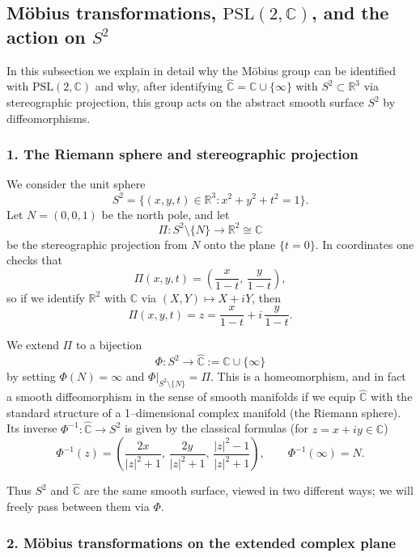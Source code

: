 \documentclass[12pt,a4paper]{article}
\theoremstyle{plain}
\theoremstyle{definition}      %
\begin{document}
	\subsection*{Möbius transformations, \texorpdfstring{$\mathrm{PSL}(2,\mathbb{C})$}{PSL(2,C)}, and the action on $S^{2}$}
	
	In this subsection we explain in detail why the Möbius group can be identified
	with $\mathrm{PSL}(2,\mathbb{C})$ and why, after identifying
	$\widehat{\mathbb{C}} = \mathbb{C}\cup\{\infty\}$ with $S^{2}\subset\mathbb{R}^3$
	via stereographic projection, this group acts on the abstract smooth surface
	$S^2$ by diffeomorphisms.
	
	\subsubsection*{1. The Riemann sphere and stereographic projection}
	
	We consider the unit sphere
	\[
	S^{2} = \{(x,y,t)\in\mathbb{R}^{3} : x^{2}+y^{2}+t^{2}=1\}.
	\]
	Let $N=(0,0,1)$ be the north pole, and let
	\[
	\Pi : S^{2}\setminus\{N\} \longrightarrow \mathbb{R}^{2}\cong\mathbb{C}
	\]
	be the stereographic projection from $N$ onto the plane $\{t=0\}$.  In
	coordinates one checks that
	\[
	\Pi(x,y,t) = \left( \frac{x}{1-t},\,\frac{y}{1-t} \right),
	\]
	so if we identify $\mathbb{R}^{2}$ with $\mathbb{C}$ via
	$(X,Y)\mapsto X+iY$, then
	\[
	\Pi(x,y,t) = z = \frac{x}{1-t} + i\,\frac{y}{1-t}.
	\]
	
	We extend $\Pi$ to a bijection
	\[
	\Phi : S^{2} \longrightarrow \widehat{\mathbb{C}} := \mathbb{C}\cup\{\infty\}
	\]
	by setting $\Phi(N) = \infty$ and $\Phi|_{S^{2}\setminus\{N\}} = \Pi$.
	This is a homeomorphism, and in fact a smooth diffeomorphism in the sense
	of smooth manifolds if we equip $\widehat{\mathbb{C}}$ with the standard
	structure of a 1--dimensional complex manifold (the Riemann sphere).  Its
	inverse $\Phi^{-1}:\widehat{\mathbb{C}}\to S^{2}$ is given by the classical
	formulas (for $z=x+iy\in\mathbb{C}$)
	\[
	\Phi^{-1}(z) =
	\left(
	\frac{2x}{|z|^{2}+1},\,
	\frac{2y}{|z|^{2}+1},\,
	\frac{|z|^{2}-1}{|z|^{2}+1}
	\right),
	\qquad
	\Phi^{-1}(\infty) = N.
	\]
	
	Thus $S^{2}$ and $\widehat{\mathbb{C}}$ are the same smooth surface, viewed
	in two different ways; we will freely pass between them via $\Phi$.
	
	\subsubsection*{2. Möbius transformations on the extended complex plane}
	
\end{document}

